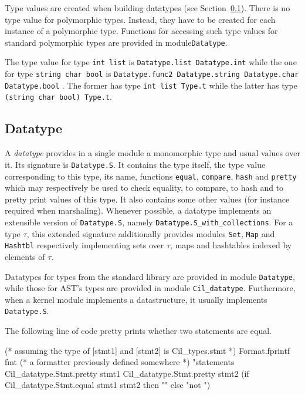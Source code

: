 Type values are created when building datatypes (see
Section~\ref{type:datatype}). There is no type value for polymorphic
types. Instead, they have to be created for each instance of a polymorphic
type. Functions for accessing such type values for standard \caml polymorphic
types are provided in module\texttt{Datatype}.
\begin{example}
The type value for type \texttt{int list} is \texttt{Datatype.list
  Datatype.int} while the one
for type \texttt{string \fl char \fl bool} is \texttt{Datatype.func2
  Datatype.string Datatype.char
  Datatype.bool}%
. The former has type
\texttt{int list Type.t} while the latter has type \texttt{(string \fl char \fl
  bool) Type.t}.
\end{example}

\subsection{Datatype}\label{type:datatype}

A \emph{datatype} provides in a single module a monomorphic type and usual
values over it. Its signature is \texttt{Datatype.S}. It
contains the type itself, the type value corresponding to this type, its name,
functions \texttt{equal}, \texttt{compare}, \texttt{hash} and \texttt{pretty}
which may respectively be used to check equality, to compare, to hash and to
pretty print values of this type. It also contains some other values (for
instance required when marshaling). Whenever possible, a
datatype implements an extensible version of \texttt{Datatype.S}, namely
\texttt{Datatype.S\_with\_collections}.
For a type $\tau$, this extended signature additionally provides modules
\texttt{Set}, \texttt{Map} and \texttt{Hashtbl} respectively implementing sets
over $\tau$, maps and hashtables indexed by elements of $\tau$.

Datatypes for \caml types from the standard library are provided in module
\texttt{Datatype}, while those for AST's types are provided in
module \texttt{Cil\_datatype}. Furthermore, when a kernel
module implements a datastructure, it usually implements
\texttt{Datatype.S}.

\begin{example}
The following line of code pretty prints whether two statements are equal.
\begin{ocamlcode}
(* assuming the type of [stmt1] and [stmt2] is Cil_types.stmt *)
Format.fprintf
  fmt (* a formatter previously defined somewhere *)
  "statements %
  Cil_datatype.Stmt.pretty stmt1
  Cil_datatype.Stmt.pretty stmt2
  (if Cil_datatype.Stmt.equal stmt1 stmt2 then "" else "not ")
\end{ocamlcode}
\end{example}

